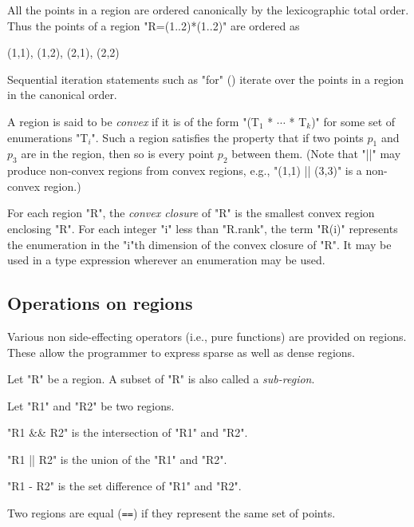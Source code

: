 All the points in a region are ordered canonically by the
lexicographic total order. Thus the points of a region \xcd"R=(1..2)*(1..2)"
are ordered as 
\begin{xten}
(1,1), (1,2), (2,1), (2,2)
\end{xten}
Sequential iteration statements such as \xcd"for" ()
iterate over the points in a region in the canonical order.

A region is said to be {\em convex} if it is of
the form \xcdmath"(T$_1$ * $\cdots$ * T$_k$)" for some set of enumerations
\xcdmath"T$_i$". Such a
region satisfies the property that if two points $p_1$ and $p_3$ are
in the region, then so is every point $p_2$ between them. (Note that
\xcd"||" may produce non-convex regions from convex regions, e.g.,
\xcd"(1,1) || (3,3)" is a non-convex region.)

For each region \xcd"R", the {\em convex closure} of \xcd"R" is the
smallest convex region enclosing \xcd"R".  For each integer \xcd"i"
less than \xcd"R.rank", the term \xcd"R(i)" represents the enumeration
in the \xcd"i"th dimension of the convex closure of \xcd"R". It may be
used in a type expression wherever an enumeration may be used.

\subsection{Operations on regions}
Various non side-effecting operators (i.e., pure functions) are
provided on regions. These allow the programmer to express sparse as
well as dense regions.

Let \xcd"R" be a region. A subset of \xcd"R" is also called a
{\em sub-region}.

Let \xcd"R1" and \xcd"R2" be two regions.

\xcd"R1 && R2" is the intersection of \xcd"R1" and \xcd"R2".

\xcd"R1 || R2" is the union of the \xcd"R1" and \xcd"R2".

\xcd"R1 - R2" is the set difference of \xcd"R1" and \xcd"R2".

Two regions are equal ({\tt ==}) if they represent the same set of
points.


